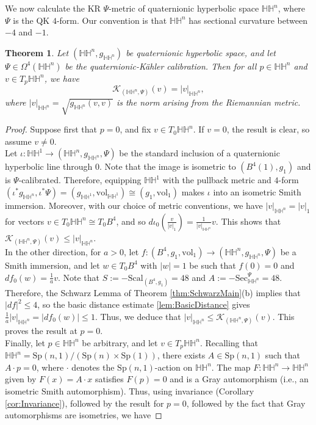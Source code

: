 \documentclass[11pt]{article}
\newcommand{\Sp}{\mathrm{Sp}}
\newcommand{\vol}{\mathrm{vol}}
\newtheorem{thm}{Theorem}[section]
\theoremstyle{definition}
\numberwithin{equation}{section}
\begin{document}
\indent We now calculate the KR $\Psi$-metric of quaternionic hyperbolic space $\mathbb{HH}^n$, where $\Psi$ is the QK $4$-form.  Our convention is that $\mathbb{HH}^n$ has sectional curvature between $-4$ and $-1$.


\begin{thm} \label{thm:Quat-Hyp} Let $(\mathbb{HH}^n, g_{\mathbb{HH}^n})$ be quaternionic hyperbolic space, and let $\Psi \in \Omega^4(\mathbb{HH}^n)$ be the quaternionic-K\"{a}hler calibration.  Then for all $p \in \mathbb{HH}^n$ and $v \in T_p\mathbb{HH}^n$, we have
$$\mathcal{K}_{(\mathbb{HH}^n, \Psi)}(v) = \left|v\right|_{\mathbb{HH}^n},$$
where $|v|_{\mathbb{HH}^n} = \sqrt{ g_{\mathbb{HH}^n}(v,v)}$ is the norm arising from the Riemannian metric.
\end{thm}

\begin{proof} Suppose first that $p = 0$, and fix $v \in T_0\mathbb{HH}^n$.  If $v = 0$, the result is clear, so assume $v \neq 0$. \\
\indent Let $\iota \colon \mathbb{HH}^1 \to (\mathbb{HH}^n, g_{\mathbb{HH}^n}, \Psi)$ be the standard inclusion of a quaternionic hyperbolic line through $0$.  Note that the image is isometric to $(B^4(1), g_1)$ and is $\Psi$-calibrated.  Therefore, equipping $\mathbb{HH}^1$ with the pullback metric and $4$-form $(\iota^*g_{\mathbb{HH}^n}, \iota^*\Psi) = (g_{\mathbb{HH}^1}, \vol_{\mathbb{HH}^1}) \cong (g_1, \vol_1)$ makes $\iota$ into an isometric Smith immersion.  Moreover, with our choice of metric conventions, we have $|v|_{\mathbb{HH}^n} = |v|_1$ for vectors $v \in T_0\mathbb{HH}^n \cong T_0B^4$, and so $d\iota_0(\frac{v}{|v|_1}) = \frac{1}{|v|_{\mathbb{HH}^n}}v$.  This shows that $\mathcal{K}_{(\mathbb{HH}^n, \Psi)}(v) \leq |v|_{\mathbb{HH}^n}$. \\
\indent In the other direction, for $a > 0$, let $f \colon (B^4, g_1, \vol_1) \to (\mathbb{HH}^n, g_{\mathbb{HH}^n}, \Psi)$ be a Smith immersion, and let $w \in T_0B^4$ with $|w| = 1$ be such that $f(0) = 0$ and $df_0(w) = \frac{1}{a}v$.  Note that $S := -\mathrm{Scal}_{(B^4, g_1)} = 48$ and $A := -\mathrm{Sec}^\Psi_{\mathbb{HH}^n} = 48$.  Therefore, the Schwarz Lemma of Theorem \ref{thm:SchwarzMain}(b) implies that $|df|^2 \leq 4$, so the basic distance estimate \ref{lem:BasicDistance} gives $\frac{1}{a}|v|_{\mathbb{HH}^n} = |df_0(w)| \leq 1$.  Thus, we deduce that $|v|_{\mathbb{HH}^n} \leq \mathcal{K}_{(\mathbb{HH}^n, \Psi)}(v)$.  This proves the result at $p = 0$. \\
\indent Finally, let $p \in \mathbb{HH}^n$ be arbitrary, and let $v \in T_p\mathbb{HH}^n$.  Recalling that $\mathbb{HH}^n = \Sp(n,1)/(\Sp(n) \times \Sp(1))$, there exists $A \in \mathrm{Sp}(n,1)$ such that $A \cdot p = 0$, where $\cdot$ denotes the $\Sp(n,1)$-action on $\mathbb{HH}^n$.  The map $F \colon \mathbb{HH}^n \to \mathbb{HH}^n$ given by $F(x) = A \cdot x$ satisfies $F(p) = 0$ and is a Gray automorphism (i.e., an isometric Smith automorphism).  Thus, using invariance (Corollary \ref{cor:Invariance}), followed by the result for $p = 0$, followed by the fact that Gray automorphisms are isometries, we have

\end{proof}
\end{document}
